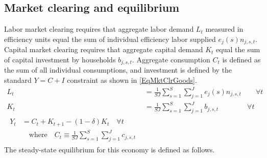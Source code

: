 \documentclass[letterpaper,12pt]{article}
\theoremstyle{definition}
\newtheorem{definition}{Definition} %
\begin{document}
\begin{spacing}{1.5}
  \subsection{Market clearing and equilibrium}\label{SecMCandEqlbm}

    Labor market clearing requires that aggregate labor demand $L_t$ measured in efficiency units equal the sum of individual efficiency labor supplied $e_j(s)n_{j,s,t}$. Capital market clearing requires that aggregate capital demand $K_t$ equal the sum of capital investment by households $b_{j,s,t}$. Aggregate consumption $C_t$ is defined as the sum of all individual consumptions, and investment is defined by the standard $Y = C + I$ constraint as shown in \eqref{EqMktClrGoods}.
    \begin{align}
      L_t &= \frac{1}{SJ}\sum_{s=1}^S\sum_{j=1}^{J} e_j(s)n_{j,s,t} \quad\quad \forall t \label{EqMktClrLab} \\
      K_t &= \frac{1}{SJ}\sum_{s=1}^{S}\sum_{j=1}^{J}b_{j,s,t} \quad\quad\quad\quad \forall t \label{EqMktClrCap} \\
      \begin{split}
        Y_t &= C_t + K_{t+1} - (1-\delta)K_t \quad\forall t \\
        &\quad\text{where}\quad C_t \equiv \frac{1}{SJ}\sum_{s=1}^{S}\sum_{j=1}^{J}c_{j,s,t}
      \end{split} \label{EqMktClrGoods}
    \end{align}
    The steady-state equilibrium for this economy is defined as follows.



\end{spacing}
\end{document}
